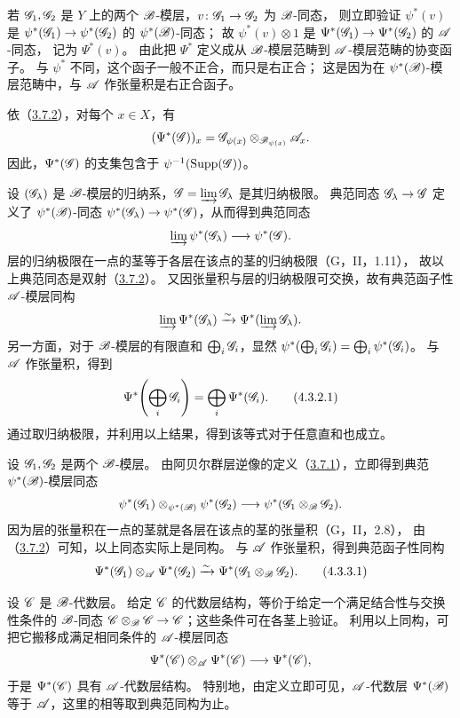 若 $\mathscr G_1,\mathscr G_2$ 是 $Y$ 上的两个 $\mathscr B$-模层，$v\colon\mathscr G_1\to\mathscr G_2$ 为 $\mathscr B$-同态，
则立即验证 $\psi^*(v)$ 是 $\psi^*(\mathscr G_1)\to\psi^*(\mathscr G_2)$ 的 $\psi^*(\mathscr B)$-同态；
故 $\psi^*(v)\otimes1$ 是 $\Psi^*(\mathscr G_1)\to\Psi^*(\mathscr G_2)$ 的 $\mathscr A$-同态，
记为 $\Psi^*(v)$。
由此把 $\Psi^*$ 定义成从 $\mathscr B$-模层范畴到 $\mathscr A$-模层范畴的协变函子。
与 $\psi^*$ 不同，这个函子一般不正合，而只是右正合；
这是因为在 $\psi^*(\mathscr B)$-模层范畴中，与 $\mathscr A$ 作张量积是右正合函子。

依（\hyperlink{para:0:3.7.2}{3.7.2}），对每个 $x\in X$，有
\[
 (\Psi^*(\mathscr G))_x
 =\mathscr G_{\psi(x)}\otimes_{\mathscr B_{\psi(x)}}\mathscr A_x.
\]
因此，$\Psi^*(\mathscr G)$ 的支集包含于 $\psi^{-1}(\operatorname{Supp}(\mathscr G))$。

设 $(\mathscr G_\lambda)$ 是 $\mathscr B$-模层的归纳系，$\mathscr G=\varinjlim\mathscr G_\lambda$ 是其归纳极限。
典范同态 $\mathscr G_\lambda\to\mathscr G$ 定义了 $\psi^*(\mathscr B)$-同态
$\psi^*(\mathscr G_\lambda)\to\psi^*(\mathscr G)$，从而得到典范同态
\[
 \varinjlim\psi^*(\mathscr G_\lambda)\longrightarrow\psi^*(\mathscr G).
\]
层的归纳极限在一点的茎等于各层在该点的茎的归纳极限（G，II，1.11），
故以上典范同态是双射（\hyperlink{para:0:3.7.2}{3.7.2}）。
又因张量积与层的归纳极限可交换，故有典范函子性 $\mathscr A$-模层同构
\[
 \varinjlim\Psi^*(\mathscr G_\lambda)
 \xrightarrow{\sim}\Psi^*(\varinjlim\mathscr G_\lambda).
\]
另一方面，对于 $\mathscr B$-模层的有限直和 $\bigoplus_i\mathscr G_i$，显然
$\psi^*(\bigoplus_i\mathscr G_i)=\bigoplus_i\psi^*(\mathscr G_i)$。
与 $\mathscr A$ 作张量积，得到
\begin{equation}
 \Psi^*\!\left(\bigoplus_i\mathscr G_i\right)
 =\bigoplus_i\Psi^*(\mathscr G_i).
 \tag{4.3.2.1}\label{eq:0:4.3.2.1}
\end{equation}
通过取归纳极限，并利用以上结果，得到该等式对于任意直和也成立。

设 $\mathscr G_1,\mathscr G_2$ 是两个 $\mathscr B$-模层。
由阿贝尔群层逆像的定义（\hyperlink{para:0:3.7.1}{3.7.1}），立即得到典范 $\psi^*(\mathscr B)$-模层同态
\[
 \psi^*(\mathscr G_1)\otimes_{\psi^*(\mathscr B)}\psi^*(\mathscr G_2)
 \longrightarrow\psi^*(\mathscr G_1\otimes_{\mathscr B}\mathscr G_2).
\]
因为层的张量积在一点的茎就是各层在该点的茎的张量积（G，II，2.8），
由（\hyperlink{para:0:3.7.2}{3.7.2}）可知，以上同态实际上是同构。
与 $\mathscr A$ 作张量积，得到典范函子性同构
\begin{equation}
 \Psi^*(\mathscr G_1)\otimes_{\mathscr A}\Psi^*(\mathscr G_2)
 \xrightarrow{\sim}\Psi^*(\mathscr G_1\otimes_{\mathscr B}\mathscr G_2).
 \tag{4.3.3.1}\label{eq:0:4.3.3.1}
\end{equation}

设 $\mathscr C$ 是 $\mathscr B$-代数层。
给定 $\mathscr C$ 的代数层结构，等价于给定一个满足结合性与交换性条件的 $\mathscr B$-同态
$\mathscr C\otimes_{\mathscr B}\mathscr C\to\mathscr C$；这些条件可在各茎上验证。
利用以上同构，可把它搬移成满足相同条件的 $\mathscr A$-模层同态
\[
 \Psi^*(\mathscr C)\otimes_{\mathscr A}\Psi^*(\mathscr C)\longrightarrow\Psi^*(\mathscr C),
\]
于是 $\Psi^*(\mathscr C)$ 具有 $\mathscr A$-代数层结构。
特别地，由定义立即可见，$\mathscr A$-代数层 $\Psi^*(\mathscr B)$ 等于 $\mathscr A$，这里的相等取到典范同构为止。

